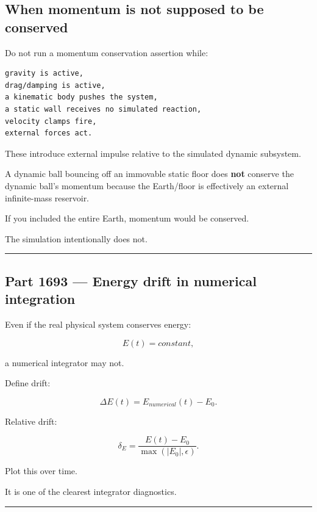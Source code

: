 \subsection{When momentum is not supposed to be conserved}\label{06-engine-ii-ch039-when-momentum-is-not-supposed-to-be-conserved}

Do not run a momentum conservation assertion while:

\begin{verbatim}
gravity is active,
drag/damping is active,
a kinematic body pushes the system,
a static wall receives no simulated reaction,
velocity clamps fire,
external forces act.
\end{verbatim}

These introduce external impulse relative to the simulated dynamic subsystem.

A dynamic ball bouncing off an immovable static floor does \textbf{not} conserve the dynamic ball's momentum because the Earth/floor is effectively an external infinite-mass reservoir.

If you included the entire Earth, momentum would be conserved.

The simulation intentionally does not.

\begin{center}\rule{0.5\linewidth}{0.5pt}\end{center}

\subsection{Part 1693 --- Energy drift in numerical integration}\label{06-engine-ii-ch039-part-1693-energy-drift-in-numerical-integration}

Even if the real physical system conserves energy:

\[
E(t)=constant,
\]

a numerical integrator may not.

Define drift:

\[
\boxed{
\Delta E(t)
=
E_{numerical}(t)-E_0.
}
\]

Relative drift:

\[
\boxed{
\delta_E
=
\frac{E(t)-E_0}
{\max(|E_0|,\epsilon)}.
}
\]

Plot this over time.

It is one of the clearest integrator diagnostics.

\begin{center}\rule{0.5\linewidth}{0.5pt}\end{center}

